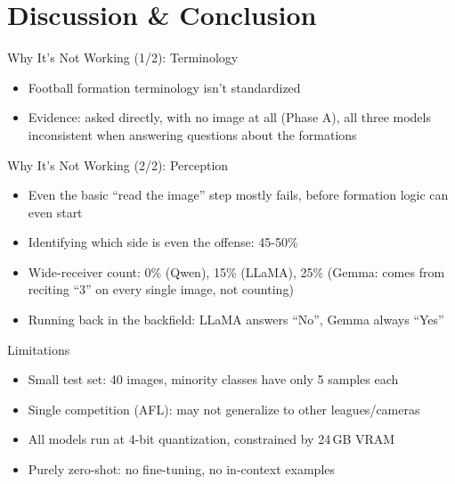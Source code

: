 \documentclass[9pt,aspectratio=169]{beamer}
\begin{document}
\section{Discussion \& Conclusion}

\begin{frame}{Why It's Not Working (1/2): Terminology}
  \begin{itemize}
    \item Football formation terminology isn't standardized
    \item Evidence: asked directly, with no image at all (Phase A), all three models inconsistent when answering questions about the formations
  \end{itemize}
\end{frame}

\begin{frame}{Why It's Not Working (2/2): Perception}
  \begin{itemize}
    \item Even the basic ``read the image'' step mostly fails, before formation logic can even start
    \item Identifying which side is even the offense: 45-50\%
    \item Wide-receiver count: 0\% (Qwen), 15\% (LLaMA), 25\% (Gemma: comes from reciting ``3'' on every single image, not counting)
    \item Running back in the backfield: LLaMA answers ``No'', Gemma always ``Yes''
  \end{itemize}
\end{frame}

\begin{frame}{Limitations}
  \footnotesize
  \begin{itemize}
    \item Small test set: 40 images, minority classes have only 5 samples each
    \item Single competition (AFL): may not generalize to other leagues/cameras
    \item All models run at 4-bit quantization, constrained by 24\,GB VRAM
    \item Purely zero-shot: no fine-tuning, no in-context examples
  \end{itemize}
\end{frame}
\end{document}
